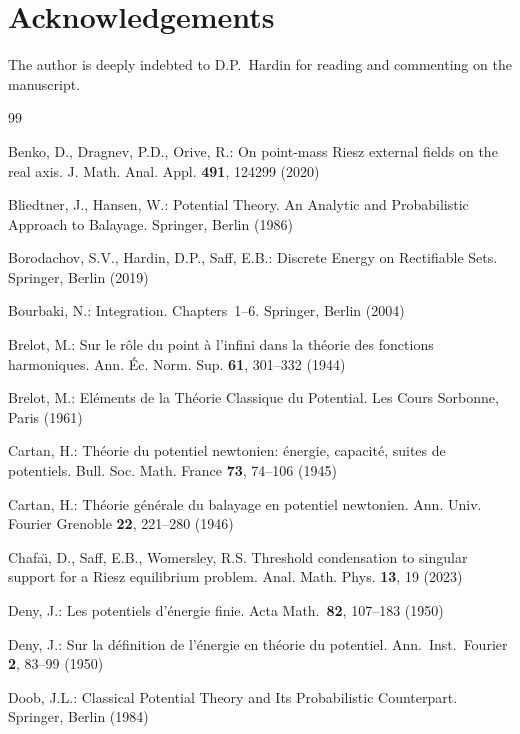 \documentclass[12pt,a4paper,reqno]{amsart} %
\theoremstyle{lause}
\theoremstyle{maaritelma}
\theoremstyle{lause}
\theoremstyle{maaritelma}
\numberwithin{equation}{section}
\begin{document}
\section{Acknowledgements} The author is deeply indebted to D.P.\ Hardin
for reading and commenting on the manuscript. 

\begin{thebibliography}{99}
\setlength{\parskip}{1.2ex plus 0.5ex minus 0.2ex}

Benko, D., Dragnev, P.D., Orive, R.: On point-mass Riesz external fields on the real axis.
J. Math. Anal. Appl. {\bf 491}, 124299 (2020)

 Bliedtner, J., Hansen, W.: Potential Theory. An Analytic and Probabilistic Approach to Balayage. Springer, Berlin (1986)

 Borodachov, S.V., Hardin, D.P., Saff, E.B.: Discrete Energy on Rectifiable Sets. Springer, Berlin (2019)

 Bourbaki, N.: Integration. Chapters~1--6.
Springer, Berlin (2004)

 Brelot, M.: Sur le r\^{o}le du point \`{a} l'infini dans la th\'{e}orie des fonctions harmoniques. Ann. \'{E}c. Norm. Sup. {\bf 61}, 301--332 (1944)

 Brelot, M.: El\'ements de la Th\'eorie Classique du Potential. Les Cours Sorbonne, Paris (1961)

 Cartan, H.: Th\'eorie du potentiel newtonien: \'energie, capacit\'e, suites de potentiels. Bull. Soc. Math. France {\bf 73}, 74--106 (1945)

 Cartan, H.: Th\'eorie g\'en\'erale du balayage en potentiel newtonien. Ann. Univ. Fourier Grenoble {\bf 22}, 221--280 (1946)

Chafa\"{\i}, D., Saff, E.B., Womersley, R.S. Threshold condensation to singular support for a Riesz equilibrium problem. Anal. Math. Phys. {\bf 13}, 19 (2023)

 Deny, J.: Les potentiels d'\'energie finie. Acta Math.\ {\bf 82}, 107--183 (1950)

 Deny, J.: Sur la d\'efinition de l'\'energie en th\'eorie du potentiel. Ann.\ Inst.\ Fourier {\bf 2}, 83--99 (1950)

 Doob, J.L.: Classical Potential Theory and Its Probabilistic Counterpart. Springer, Berlin (1984)


\end{thebibliography}
\end{document}
